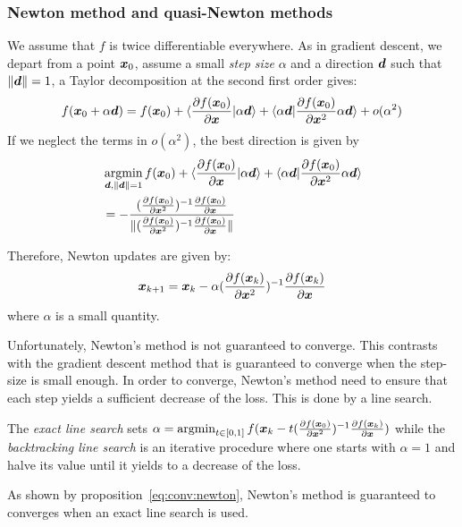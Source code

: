\subsubsection{Newton method and quasi-Newton methods}
\label{sec:qn}
We assume that $f$ is twice differentiable everywhere.
As in gradient descent, we depart from a point $\xb_0$, assume a small \emph{step size} $\alpha$ and a direction
$\db$ such that $\|\db\| = 1$, a Taylor decomposition at the second first order gives:
\begin{align}
  f(\xb_0 + \alpha \db) = f(\xb_0) + \langle \partialfrac{\xb}{f(\xb_0)} | \alpha \db \rangle + \langle \alpha \db | \partialfrac{\xb^2}{f(\xb_0)} \alpha \db \rangle + o(\alpha^2) 
\end{align}
If we neglect the terms in $o(\alpha^2)$, the best direction is given by
\begin{align}
  &\argmin_{\db, \|\db\| = 1} f(\xb_0) + \langle \partialfrac{\xb}{f(\xb_0)} | \alpha \db \rangle + \langle \alpha \db | \partialfrac{\xb^2}{f(\xb_0)} \alpha \db \rangle \\
  &= - \frac{(\partialfrac{\xb^2}{f(\xb_0)})^{-1}\partialfrac{\xb}{f(\xb_0)}}{\| (\partialfrac{\xb^2}{f(\xb_0)})^{-1} \partialfrac{\xb}{f(\xb_0)}\|}
\end{align}


Therefore, Newton updates are given by:
\begin{align}
  \xb_{k+1} = \xb_k -\alpha (\partialfrac{\xb^2}{f(\xb_k)})^{-1} \partialfrac{\xb}{f(\xb_k)} \label{eq:update:newton}
\end{align}
where $\alpha$ is a small quantity.

Unfortunately, Newton's method is not guaranteed to converge. This contrasts with the gradient descent method that is guaranteed to converge when the step-size is small enough.
In order to converge, Newton's method need to ensure that each step yields a sufficient decrease of the loss. This is done by a line search.

The \emph{exact line search} sets $\alpha = \argmin_{t \in [0, 1]} f(\xb_k - t
(\partialfrac{\xb^2}{f(\xb_0)})^{-1} \partialfrac{\xb}{f(\xb_k)})$ while the \emph{backtracking line search} is an iterative procedure where one starts with $\alpha=1$ and halve its value until it yields to a decrease of the loss.

As shown by proposition~\ref{eq:conv:newton}, Newton's method is guaranteed to converges when an
exact line search is used.

